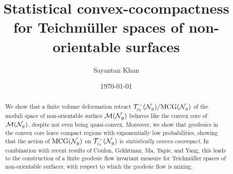 \documentclass[12pt, reqno]{amsart}
\title[Statistical convex-cocompactness for $\teich(\no_g)$]{Statistical convex-cocompactness for Teichmüller spaces of non-orientable surfaces}
\author{Sayantan Khan}
\date{\today}
\begin{document}
\begin{abstract}
  We show that a finite volume deformation retract $\mathcal{T}_{\varepsilon_t}^{-}(\mathcal{N}_g)/\mathrm{MCG}(\mathcal{N}_g)$ of the moduli space of non-orientable surface $\mathcal{M}(\mathcal{N}_g)$ behaves like the convex core of $\mathcal{M}(\mathcal{N}_g)$, despite not even being quasi-convex.
  Moreover, we show that geodesics in the convex core leave compact regions with exponentially low probabilities, showing that the action of $\mathrm{MCG}(\mathcal{N}_g)$ on $\mathcal{T}_{\varepsilon_t}^{-}(\mathcal{N}_g)$ is \emph{statistically convex-cocompact}.
  In combination with recent results of Coulon, Gekhtman, Ma, Tapie, and Yang, this leads to the construction of a finite geodesic flow invariant measure for Teichmüller spaces of non-orientable surfaces, with respect to which the geodesic flow is mixing.
\end{abstract}
\maketitle








\appendix



\printbibliography
\end{document}
